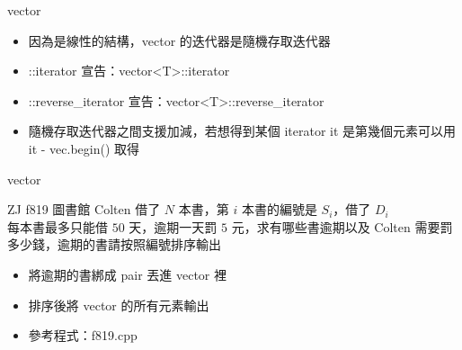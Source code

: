 \documentclass[aspectratio=169]{beamer}
\begin{document}
    \begin{frame}{vector}
        \begin{itemize}
            \item<1-> 因為是線性的結構，vector 的迭代器是隨機存取迭代器
            \item<2-> ::iterator 宣告：vector<T>::iterator
            \item<2-> ::reverse\_iterator 宣告：vector<T>::reverse\_iterator
            \item<3-> 隨機存取迭代器之間支援加減，若想得到某個 iterator it 是第幾個元素可以用 it - vec.begin() 取得
        \end{itemize}
    \end{frame}

    \begin{frame}{vector}
        \begin{block}{ZJ f819 圖書館}
            Colten 借了 $N$ 本書，第 $i$ 本書的編號是 $S_i$，借了 $D_i$\\
            每本書最多只能借 $50$ 天，逾期一天罰 $5$ 元，求有哪些書逾期以及 Colten 需要罰多少錢，逾期的書請按照編號排序輸出
        \end{block}

        \begin{itemize}
            \item<2-> 將逾期的書綁成 pair 丟進 vector 裡
            \item<3-> 排序後將 vector 的所有元素輸出
            \item<4-> 參考程式：f819.cpp
        \end{itemize}
    \end{frame}
\end{document}
